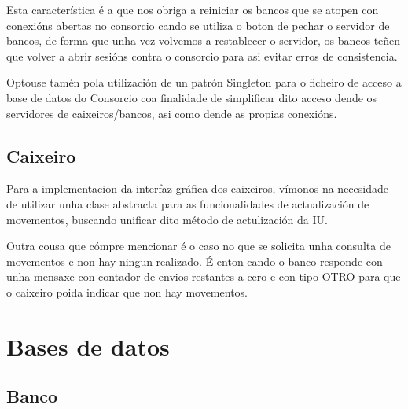 \documentclass[a4paper,titlepage]{article}
\begin{document}
Esta característica é a que nos obriga a reiniciar os bancos que se atopen con conexións abertas no consorcio cando se utiliza o boton de pechar o servidor de bancos, de forma que unha vez volvemos a restablecer o servidor, os bancos teñen que volver a abrir sesións contra o consorcio para asi evitar erros de consistencia.

Optouse tamén pola utilización de un patrón Singleton para o ficheiro de acceso a base de datos do Consorcio coa finalidade de simplificar dito acceso dende os servidores de caixeiros/bancos, asi como dende as propias conexións.



\subsection {Caixeiro}
Para a implementacion da interfaz gráfica dos caixeiros, vímonos na necesidade de utilizar unha clase abstracta para as funcionalidades de actualización de movementos, buscando unificar dito método de actulización da IU.

Outra cousa que cómpre mencionar é o caso no que se solicita unha consulta de movementos e non hay ningun realizado. É enton cando o banco responde con unha mensaxe con contador de envios restantes a cero e con tipo OTRO para que o caixeiro poida indicar que non hay movementos.


\newpage

\clearpage
\newpage


\section {Bases de datos}
\subsection {Banco}
\end{document}
